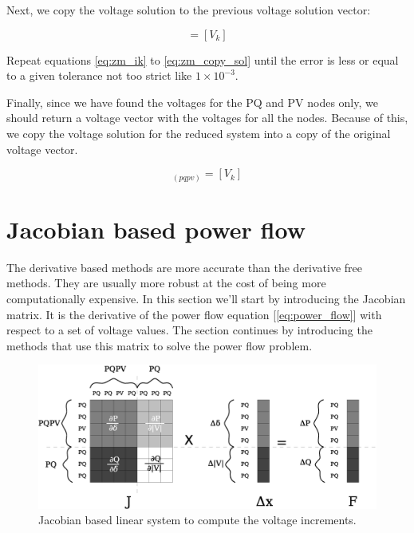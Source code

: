 \documentclass[nols,a4paper,twoside,notoc,fleqn]{tufte-book}
\begin{document}

Next, we copy the voltage solution to the previous voltage solution vector:

\begin{equation}
[V_{prev}] = [V_k]
\label{eq:zm_copy_sol}
\end{equation}

Repeat equations \ref{eq:zm_ik} to \ref{eq:zm_copy_sol} until the error is less or equal to a given tolerance not too strict like $1\times10^{-3}$.

Finally, since we have found the voltages for the PQ and PV nodes only, we should return a voltage vector with the voltages for all the nodes. Because of this, we copy the voltage solution for the reduced system into a copy of the original voltage vector.

\begin{equation}
[V]_{(pqpv)} = [V_k]
\end{equation}


\section{Jacobian based power flow}

The derivative based methods are more accurate than the derivative free methods. They are usually more robust at the cost of being more computationally expensive. In this section we'll start by introducing the Jacobian matrix. It is the derivative of the power flow equation  [\ref{eq:power_flow}] with respect to a set of voltage values. The section continues by introducing the methods that use this matrix to solve the power flow problem.

\begin{center}
\begin{figure}[h!]
  \includegraphics[width=0.9\linewidth]{img/JacobianBased.eps}
  \caption{Jacobian based linear system to compute the voltage increments.}
  \label{fig:jacobian_based}
\end{figure}
\end{center}
\end{document}

